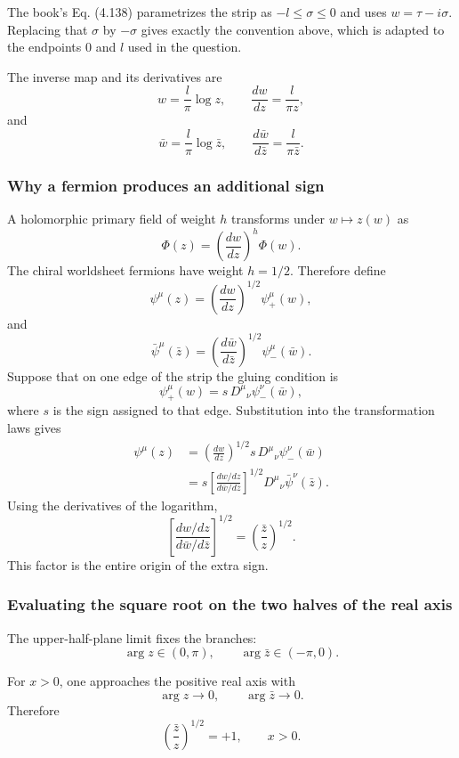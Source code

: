 \documentclass[
  10pt,
  a4paper,
  openany]{book}
\begin{document}
The book's Eq. (4.138) parametrizes the strip as \(-l\leq\sigma\leq0\)
and uses \(w=\tau-i\sigma\). Replacing that \(\sigma\) by \(-\sigma\)
gives exactly the convention above, which is adapted to the endpoints
\(0\) and \(l\) used in the question.

The inverse map and its derivatives are \[
w=\frac{l}{\pi}\log z,
\qquad
\frac{dw}{dz}=\frac{l}{\pi z},
\] and \[
\bar w=\frac{l}{\pi}\log\bar z,
\qquad
\frac{d\bar w}{d\bar z}=\frac{l}{\pi\bar z}.
\]

\subsubsection{Why a fermion produces an additional
sign}\label{why-a-fermion-produces-an-additional-sign}

A holomorphic primary field of weight \(h\) transforms under
\(w\mapsto z(w)\) as \[
\Phi(z)
=
\left(\frac{dw}{dz}\right)^h\Phi(w).
\] The chiral worldsheet fermions have weight \(h=1/2\). Therefore
define \[
\psi^\mu(z)
=
\left(\frac{dw}{dz}\right)^{1/2}\psi_+^\mu(w),
\] and \[
\bar\psi^\mu(\bar z)
=
\left(\frac{d\bar w}{d\bar z}\right)^{1/2}\psi_-^\mu(\bar w).
\] Suppose that on one edge of the strip the gluing condition is \[
\psi_+^\mu(w)
=s\,{D^\mu}_{\nu}\psi_-^\nu(\bar w),
\] where \(s\) is the sign assigned to that edge. Substitution into the
transformation laws gives \[
\begin{aligned}
\psi^\mu(z)
&=
\left(\frac{dw}{dz}\right)^{1/2}
s\,{D^\mu}_{\nu}\psi_-^\nu(\bar w)\\%
&=
s
\left[
\frac{dw/dz}{d\bar w/d\bar z}
\right]^{1/2}
{D^\mu}_{\nu}\bar\psi^\nu(\bar z).
\end{aligned}
\] Using the derivatives of the logarithm, \[
\left[
\frac{dw/dz}{d\bar w/d\bar z}
\right]^{1/2}
=
\left(\frac{\bar z}{z}\right)^{1/2}.
\] This factor is the entire origin of the extra sign.

\subsubsection{Evaluating the square root on the two halves of the real
axis}\label{evaluating-the-square-root-on-the-two-halves-of-the-real-axis}

The upper-half-plane limit fixes the branches: \[
\arg z\in(0,\pi),
\qquad
\arg\bar z\in(-\pi,0).
\]

For \(x>0\), one approaches the positive real axis with \[
\arg z\longrightarrow0,
\qquad
\arg\bar z\longrightarrow0.
\] Therefore \[
\left(\frac{\bar z}{z}\right)^{1/2}=+1,
\qquad x>0.
\]
\end{document}

